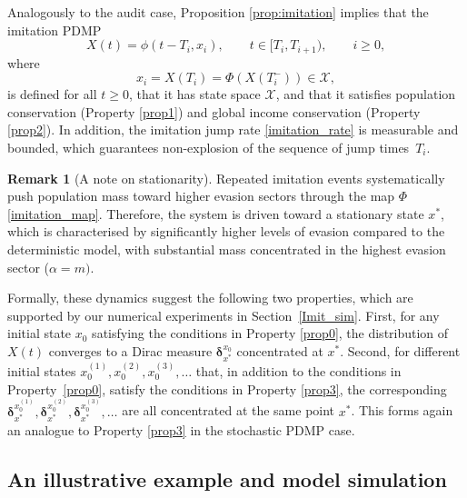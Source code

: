 \documentclass[11pt]{article}
\theoremstyle{plain}
\theoremstyle{definition}
\newtheorem{remark}{Remark}
\newcommand{\1}{\mathbf{1}}
\begin{document}
Analogously to the audit case, Proposition \ref{prop:imitation} implies that the imitation PDMP
\begin{equation*}
    X(t)=\phi(t-T_i,x_i), \qquad t \in [T_i,T_{i+1}), \qquad i\geq 0,
\end{equation*}
where
\begin{equation*}
    x_i=X(T_i)=\Phi (X(T_i^-)) \in \mathcal{X},
\end{equation*}
is defined for all $t\geq 0$, that it has state space $\mathcal{X}$, and that it satisfies population conservation (Property \ref{prop1}) and global income conservation (Property \ref{prop2}). In addition, the imitation jump rate \eqref{imitation_rate} is measurable and bounded, which guarantees non-explosion of the sequence of jump times~$T_i$.


\begin{remark}[A note on stationarity]\label{rem:imitation_stationary}
Repeated imitation events systematically push population mass toward higher evasion sectors through the map $\Phi$ \eqref{imitation_map}. Therefore, the system is driven toward a stationary state $x^*$, which is characterised by significantly higher levels of evasion compared to the deterministic model, with substantial mass concentrated in the highest evasion sector ($\alpha=m)$. 

Formally, these dynamics suggest the following two properties, which are supported by our numerical experiments in Section~\ref{Imit_sim}. First, for any initial state $x_0$ satisfying the conditions in Property \ref{prop0}, the distribution of $X(t)$ converges to a Dirac measure $\boldsymbol{\delta}_{x^*}^{x_0}$ concentrated at $x^*$. Second, for different initial states $x_0^{(1)},x_0^{(2)},x_0^{(3)},\ldots$ that, in addition to the conditions in Property~\ref{prop0}, satisfy the conditions in Property \ref{prop3}, the corresponding $\boldsymbol{\delta}_{x^*}^{x_0^{(1)}},\boldsymbol{\delta}_{x^*}^{x_0^{(2)}},\boldsymbol{\delta}_{x^*}^{x_0^{(3)}},\ldots$ are all concentrated at the same point $x^*$. This forms again an analogue to Property \ref{prop3} in the stochastic
PDMP case. 
\label{Imit_convg}
\end{remark}

\subsection{An illustrative example and model simulation}
\label{ex:3x2}
\end{document}
